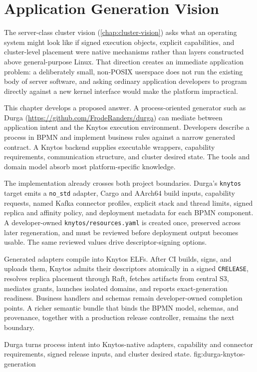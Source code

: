 \chapter{Application Generation Vision}
\label{chap:application-vision}

The server-class cluster vision (\autoref{chap:cluster-vision}) asks what an operating system
might look like if signed execution objects, explicit capabilities, and
cluster-level placement were native mechanisms rather than layers constructed
above general-purpose Linux. That direction creates an immediate application
problem: a deliberately small, non-POSIX userspace does not run the existing
body of server software, and asking ordinary application developers to program
directly against a new kernel interface would make the platform impractical.

This chapter develops a proposed answer. A process-oriented generator such as
Durga (\url{https://github.com/FrodeRanders/durga}) can mediate between
application intent and the Knytos execution environment. Developers describe
a process in BPMN and implement business rules against a narrow generated
contract. A Knytos backend supplies executable wrappers, capability
requirements, communication structure, and cluster desired state. The tools and
domain model absorb most platform-specific knowledge.

The implementation already crosses both project boundaries. Durga's
\texttt{knytos} target emits a \texttt{no\_std} adapter, Cargo and AArch64
build inputs, capability requests, named Kafka connector profiles, explicit
stack and thread limits, signed replica and affinity policy, and deployment
metadata for each BPMN component. A developer-owned
\texttt{knytos/resources.yaml} is created once, preserved across later
regeneration, and must be reviewed before deployment output becomes usable. The
same reviewed values drive descriptor-signing options.

Generated adapters compile into Knytos ELFs. After CI builds, signs, and
uploads them, Knytos admits their descriptors atomically in a signed
\texttt{CRELEASE}, resolves replica placement through Raft, fetches artifacts
from central S3, mediates grants, launches isolated domains, and reports
exact-generation readiness. Business handlers and schemas remain
developer-owned completion points. A richer semantic bundle that binds the BPMN
model, schemas, and provenance, together with a production release controller,
remains the next boundary.

    {Durga turns process intent into Knytos-native adapters, capability and
    connector requirements, signed release inputs, and cluster desired state.}
    {fig:durga-knytos-generation}

